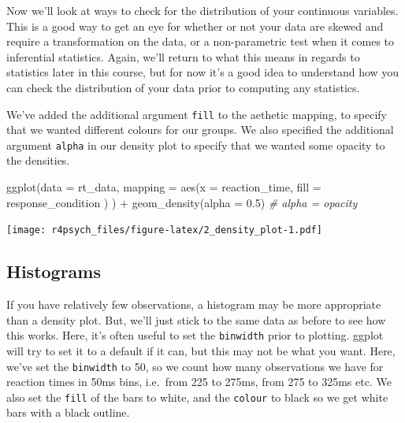 \documentclass[
]{book}
\newenvironment{Shaded}{\begin{snugshade}}{\end{snugshade}}
\newcommand{\AttributeTok}[1]{\textcolor[rgb]{0.77,0.63,0.00}{#1}}
\newcommand{\CommentTok}[1]{\textcolor[rgb]{0.56,0.35,0.01}{\textit{#1}}}
\newcommand{\FloatTok}[1]{\textcolor[rgb]{0.00,0.00,0.81}{#1}}
\newcommand{\FunctionTok}[1]{\textcolor[rgb]{0.00,0.00,0.00}{#1}}
\newcommand{\NormalTok}[1]{#1}
\newcommand{\SpecialCharTok}[1]{\textcolor[rgb]{0.00,0.00,0.00}{#1}}
\begin{document}
Now we'll look at ways to check for the distribution of your continuous variables. This is a good way to get an eye for whether or not your data are skewed and require a transformation on the data, or a non-parametric test when it comes to inferential statistics. Again, we'll return to what this means in regards to statistics later in this course, but for now it's a good idea to understand how you can check the distribution of your data prior to computing any statistics.

We've added the additional argument \texttt{fill} to the aethetic mapping, to specify that we wanted different colours for our groups. We also specified the additional argument \texttt{alpha} in our density plot to specify that we wanted some opacity to the densities.

\begin{Shaded}
\begin{Highlighting}[]
\FunctionTok{ggplot}\NormalTok{(}\AttributeTok{data =}\NormalTok{ rt\_data, }
       \AttributeTok{mapping =} \FunctionTok{aes}\NormalTok{(}\AttributeTok{x =}\NormalTok{ reaction\_time, }
                     \AttributeTok{fill =}\NormalTok{ response\_condition}
\NormalTok{                     )}
\NormalTok{       ) }\SpecialCharTok{+}
  \FunctionTok{geom\_density}\NormalTok{(}\AttributeTok{alpha =} \FloatTok{0.5}\NormalTok{) }\CommentTok{\# alpha = opacity}
\end{Highlighting}
\end{Shaded}

\texttt{[image: r4psych\_files/figure-latex/2\_density\_plot-1.pdf]}

\hypertarget{histograms}{%
\subsection{Histograms}\label{histograms}}

If you have relatively few observations, a histogram may be more appropriate than a density plot. But, we'll just stick to the same data as before to see how this works.
Here, it's often useful to set the \texttt{binwidth} prior to plotting. ggplot will try to set it to a default if it can, but this may not be what you want. Here, we've set the \texttt{binwidth} to 50, so we count how many observations we have for reaction times in 50ms bins, i.e.~from 225 to 275ms, from 275 to 325ms etc. We also set the \texttt{fill} of the bars to white, and the \texttt{colour} to black so we get white bars with a black outline.
\end{document}
